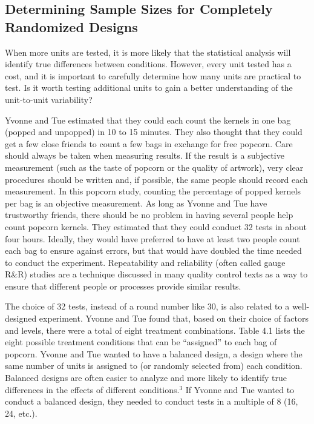 \documentclass[
]{report}
\begin{document}
\hypertarget{determining-sample-sizes-for-completely-randomized-designs}{%
\subsection*{Determining Sample Sizes for Completely Randomized Designs}\label{determining-sample-sizes-for-completely-randomized-designs}}

When more units are tested, it is more likely that the statistical analysis will identify true differences between conditions. However, every unit tested has a cost, and it is important to carefully determine how many units are practical to test. Is it worth testing additional units to gain a better understanding of the unit-to-unit variability?

Yvonne and Tue estimated that they could each count the kernels in one bag (popped and unpopped) in 10 to 15 minutes. They also thought that they could get a few close friends to count a few bags in exchange for free popcorn. Care should always be taken when measuring results. If the result is a subjective measurement (such as the taste of popcorn or the quality of artwork), very clear procedures should be written and, if possible, the same people should record each measurement. In this popcorn study, counting the percentage of popped kernels per bag is an objective measurement. As long as Yvonne and Tue have trustworthy friends, there should be no problem in having several people help count popcorn kernels. They estimated that they could conduct 32 tests in about four hours. Ideally, they would have preferred to have at least two people count each bag to ensure against errors, but that would have doubled the time needed to conduct the experiment. Repeatability and reliability (often called gauge R\&R) studies are a technique discussed in many quality control texts as a way to ensure that different people or processes provide similar results.

The choice of 32 tests, instead of a round number like 30, is also related to a well-designed experiment. Yvonne and Tue found that, based on their choice of factors and levels, there were a total of eight treatment combinations. Table 4.1 lists the eight possible treatment conditions that can be ``assigned'' to each bag of popcorn. Yvonne and Tue wanted to have a balanced design, a design where the same number of units is assigned to (or randomly selected from) each condition. Balanced designs are often easier to analyze and more likely to identify true differences in the effects of different conditions.\(^3\) If Yvonne and Tue wanted to conduct a balanced design, they needed to conduct tests in a multiple of 8 (16, 24, etc.).
\end{document}
